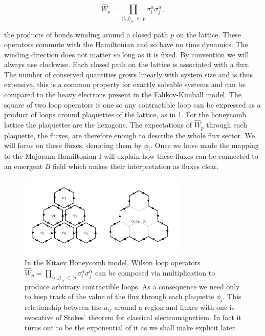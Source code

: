 \[\hat{W}_p = \prod_{\langle i,j\rangle_\alpha\; \in\; p} \sigma_i^{\alpha}\sigma_j^{\alpha},\]

the products of bonds winding around a closed path \(p\) on the lattice. These operators commute with the Hamiltonian and so have no time dynamics. The winding direction does not matter so long as it is fixed. By convention we will always use clockwise. Each closed path on the lattice is associated with a flux. The number of conserved quantities grows linearly with system size and is thus extensive, this is a common property for exactly solvable systems and can be compared to the heavy electrons present in the Falikov-Kimball model. The square of two loop operators is one so any contractible loop can be expressed as a product of loops around plaquettes of the lattice, as in \cref{fig:stokes_theorem}. For the honeycomb lattice the plaquettes are the hexagons. The expectations of \(\hat{W}_p\) through each plaquette, the fluxes, are therefore enough to describe the whole flux sector. We will focus on these fluxes, denoting them by \(\phi_i\). Once we have made the mapping to the Majorana Hamiltonian I will explain how these fluxes can be connected to an emergent \(B\) field which makes their interpretation as fluxes clear.

\hypertarget{fig:stokes_theorem}{%
\begin{figure}
\centering
\includegraphics[width=0.71\textwidth,height=\textheight]{figure_code/amk_chapter/stokes_theorem/stokes_theorem}
\caption[{We can construct arbitrary loops from plaquette fluxes.}]{In the Kitaev Honeycomb model, Wilson loop operators \(\hat{W}_p = \prod_{\langle i,j\rangle_\alpha\; \in\; p} \sigma_i^{\alpha}\sigma_j^{\alpha}\) can be composed via multiplication to produce arbitrary contractible loops. As a consequence we need only to keep track of the value of the flux through each plaquette \(\phi_i\). This relationship between the \(u_{ij}\) around a region and fluxes with one is evocative of Stokes' theorem for classical electromagnetism. In fact it turns out to be the exponential of it as we shall make explicit later.}
\label{fig:stokes_theorem}
\end{figure}
}

